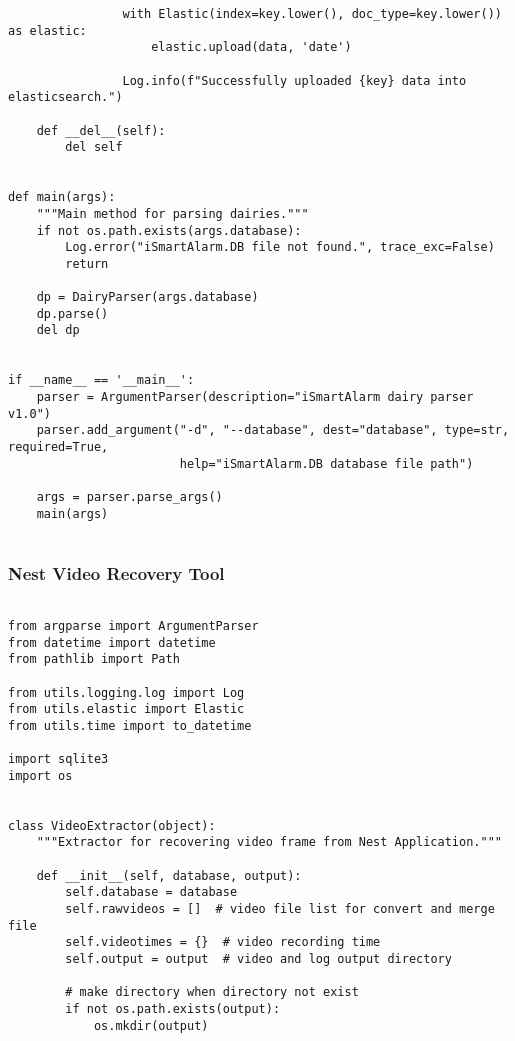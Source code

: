 \documentclass{easychair}
\begin{document}
\begin{enumerate}
\begin{lstlisting}
                with Elastic(index=key.lower(), doc_type=key.lower()) as elastic:
                    elastic.upload(data, 'date')
                
                Log.info(f"Successfully uploaded {key} data into elasticsearch.")

    def __del__(self):
        del self


def main(args):
    """Main method for parsing dairies."""
    if not os.path.exists(args.database):
        Log.error("iSmartAlarm.DB file not found.", trace_exc=False)
        return

    dp = DairyParser(args.database)
    dp.parse()
    del dp


if __name__ == '__main__':
    parser = ArgumentParser(description="iSmartAlarm dairy parser v1.0")
    parser.add_argument("-d", "--database", dest="database", type=str, required=True,
                        help="iSmartAlarm.DB database file path")

    args = parser.parse_args()
    main(args)


\end{lstlisting}





\subsubsection{Nest Video Recovery Tool}

\lstset{language=Python}
\lstset{frame=lines}
\lstset{basicstyle=\footnotesize}
\begin{lstlisting}

from argparse import ArgumentParser
from datetime import datetime
from pathlib import Path

from utils.logging.log import Log
from utils.elastic import Elastic
from utils.time import to_datetime

import sqlite3
import os


class VideoExtractor(object):
    """Extractor for recovering video frame from Nest Application."""

    def __init__(self, database, output):
        self.database = database
        self.rawvideos = []  # video file list for convert and merge file
        self.videotimes = {}  # video recording time
        self.output = output  # video and log output directory

        # make directory when directory not exist
        if not os.path.exists(output):
            os.mkdir(output)


\end{lstlisting}
\end{enumerate}
\end{document}
